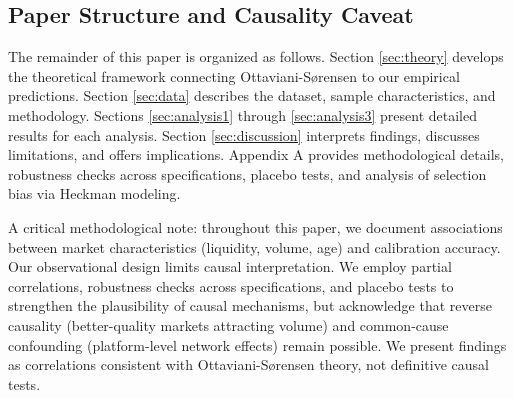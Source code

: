 \subsection{Paper Structure and Causality Caveat}
\label{subsec:structure}

The remainder of this paper is organized as follows. Section \ref{sec:theory} develops the theoretical framework connecting Ottaviani-Sørensen to our empirical predictions. Section \ref{sec:data} describes the dataset, sample characteristics, and methodology. Sections \ref{sec:analysis1} through \ref{sec:analysis3} present detailed results for each analysis. Section \ref{sec:discussion} interprets findings, discusses limitations, and offers implications. Appendix A provides methodological details, robustness checks across specifications, placebo tests, and analysis of selection bias via Heckman modeling.

A critical methodological note: throughout this paper, we document associations between market characteristics (liquidity, volume, age) and calibration accuracy. Our observational design limits causal interpretation. We employ partial correlations, robustness checks across specifications, and placebo tests to strengthen the plausibility of causal mechanisms, but acknowledge that reverse causality (better-quality markets attracting volume) and common-cause confounding (platform-level network effects) remain possible. We present findings as correlations consistent with Ottaviani-Sørensen theory, not definitive causal tests.
